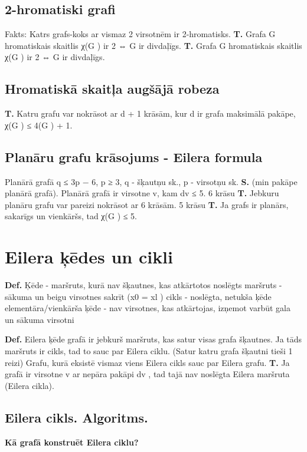 \documentclass{article}
\begin{document}
\subsection{2-hromatiski grafi}
Fakts: Katrs grafs-koks ar vismaz 2 virsotnēm ir 2-hromatisks.
\textbf{T. }Grafa G hromatiskais skaitlis χ(G ) ir 2 ⇔ G ir divdaļīgs.
\textbf{T. }Grafa G hromatiskais skaitlis χ(G ) ir 2 ⇔ G ir divdaļīgs.
 
\subsection{Hromatiskā skaitļa augšājā robeza}
\textbf{T. } Katru grafu var nokrāsot ar d + 1 krāsām, kur d ir grafa maksimālā pakāpe, χ(G ) ≤ 4(G ) + 1.

\subsection{Planāru grafu krāsojums - Eilera formula}

Planārā grafā q ≤ 3p − 6, p ≥ 3, q - šķautņu sk., p - virsotņu sk.
\textbf{S. }(min pakāpe planārā grafā). Planārā grafā ir virsotne v, kam dv ≤ 5.
6 krāsu \textbf{T. }Jebkuru planāru grafu var pareizi nokrāsot ar 6 krāsām.
5 krāsu \textbf{T. }Ja grafs ir planārs, sakarīgs un vienkāršs, tad χ(G ) ≤ 5.

\section{Eilera ķēdes un cikli}

\textbf{Def.} Ķēde - maršruts, kurā nav šķautnes, kas atkārtotos
noslēgts maršruts - sākuma un beigu virsotnes sakrīt (x0 = xl )
cikls - noslēgta, netukša ķēde
elementāra/vienkārša ķēde - nav virsotnes, kas atkārtojas, izņemot
varbūt gala un sākuma virsotni

\textbf{Def.}  Eilera ķēde grafā ir jebkurš maršruts, kas satur visas grafa šķautnes.
Ja tāds maršruts ir cikls, tad to sauc par Eilera ciklu. (Satur katru grafa šķautni tieši 1 reizi) Grafu, kurā eksistē vismaz viens Eilera cikls sauc par Eilera grafu.
\textbf{T. } Ja grafā ir virsotne v ar nepāra pakāpi dv , tad tajā nav noslēgta Eilera maršruta (Eilera cikla).

\subsection{Eilera cikls. Algoritms.}
\textbf{Kā grafā konstruēt Eilera ciklu?}
\end{document}
